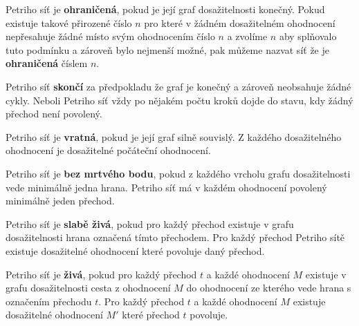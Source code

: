 \documentclass[
  biblatex,
  glossaries,
]{kidiplom}
\begin{document}
\begin{definition}
  
  Petriho síť je \textbf{ohraničená}, pokud 
  je její graf dosažitelnosti konečný. Pokud existuje takové přirozené číslo $n$
  pro které v žádném dosažitelném ohodnocení nepřesahuje žádné místo svým ohodnocením 
  číslo $n$ a zvolíme $n$ aby splňovalo tuto podmínku a zároveň bylo 
  nejmenší možné, pak můžeme nazvat síť že je \textbf{ohraničená} číslem $n$.
  
\end{definition}
\begin{definition}\label{def:skončí}
  
  Petriho síť \textbf{skončí} za předpokladu
  že graf je konečný a zároveň neobsahuje žádné cykly.
  Neboli Petriho síť vždy po nějakém počtu kroků dojde do stavu, kdy žádný přechod není povolený.
  
\end{definition}
\begin{definition}
  
  Petriho síť je \textbf{vratná},
  pokud je její graf silně souvislý. Z každého dosažitelného 
  ohodnocení je dosažitelné počáteční ohodnocení.

\end{definition}
\clearpage
\begin{definition}
  
  Petriho síť je \textbf{bez mrtvého bodu},
  pokud z každého vrcholu grafu
  dosažitelnosti vede minimálně jedna hrana.
  Petriho síť má v každém ohodnocení povolený minimálně jeden přechod.

\end{definition}
\begin{definition}
  
  Petriho síť je \textbf{slabě živá}, pokud pro
  každý přechod existuje v grafu dosažitelnosti hrana označená tímto přechodem.
  Pro každý přechod Petriho sítě existuje dosažitelné ohodnocení které 
  povoluje daný přechod.

\end{definition}
\begin{definition}
  
  Petriho síť je \textbf{živá}, pokud 
  pro každý přechod $t$ a každé ohodnocení $M$ existuje v grafu dosažitelnosti cesta
  z ohodnocení $M$ do ohodnocení ze kterého vede hrana s označením přechodu $t$.
  Pro každý přechod $t$ a každé ohodnocení $M$ existuje dosažitelné ohodnocení $M'$ které přechod $t$ povoluje.
  
\end{definition}
  
\end{document}
